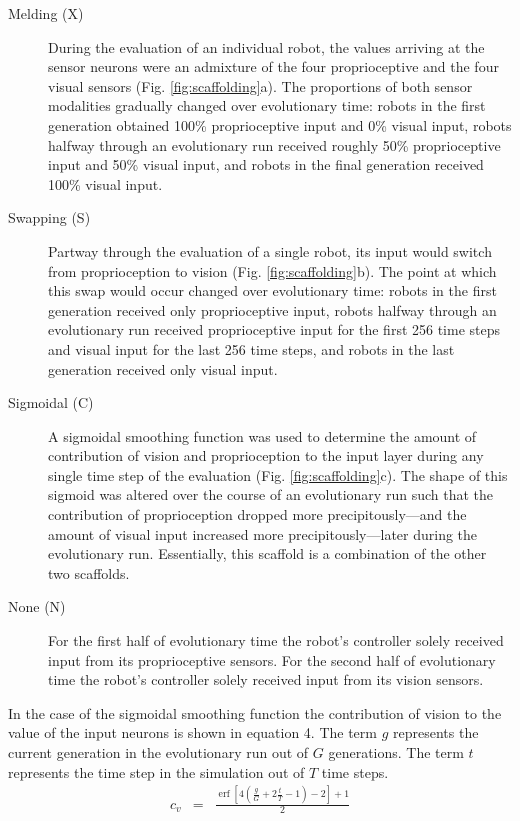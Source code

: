 \documentclass{sig-alternate}
\DeclareMathOperator\erf{erf}
\begin{document}
\begin {description}

\item[Melding (X)] During the evaluation of an individual robot, the values arriving at the sensor neurons were an admixture of the four proprioceptive and the four visual
sensors (Fig. \ref{fig:scaffolding}a). The proportions of both sensor modalities gradually changed over evolutionary time: robots in the first generation obtained 100\% proprioceptive input and 0\% visual input, robots halfway through an evolutionary run received roughly 50\% proprioceptive input and 50\% visual input, and robots in the final generation received 100\% visual input.
\item[Swapping (S)] Partway through the evaluation of a single robot, its input would switch from proprioception to vision (Fig. \ref{fig:scaffolding}b). The point at which this swap would occur
changed over evolutionary time: robots in the first generation received only proprioceptive input, robots halfway through an evolutionary run received proprioceptive
input for the first 256 time steps and visual input for the last 256 time steps, and robots in the last generation received only visual input.
\item [Sigmoidal (C)] A sigmoidal smoothing function was used to determine the amount of contribution of vision and proprioception to the input layer during any single
  time step of the evaluation (Fig. \ref{fig:scaffolding}c). The shape of this sigmoid was altered over the course of an evolutionary run such that the contribution of proprioception dropped more precipitously---and the amount of visual input increased more precipitously---later during the evolutionary run. Essentially, this scaffold is a combination of the other two scaffolds.
\item [None (N)] For the first half of evolutionary time the robot's controller solely received input from its proprioceptive sensors. For the second half of evolutionary time the robot's controller solely received input from its vision sensors. 
\end {description}

  In the case of the sigmoidal smoothing function the contribution of vision to the value of the input neurons is shown in equation 4. The term $g$ represents the current generation in the evolutionary run out of $G$ generations. The term $t$ represents the time step in the simulation out of $T$ time steps. 
  \begin {eqnarray}
  c_v &=& \frac{ \erf \left[ 4 \left( \frac{g}{G} + 2 \frac{t}{T} - 1 \right) - 2 \right] + 1}{2}
\end {eqnarray}
\end{document}

